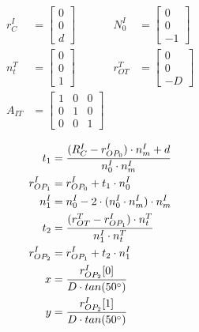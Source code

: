 \begin{align*}
    r^{I}_{C}       & =
    \begin{bmatrix}
        0 \\
        0 \\
        d
    \end{bmatrix} &
    N^{I}_{0}       & =
    \begin{bmatrix}
        0 \\
        0 \\
        -1
    \end{bmatrix}      \\
    n^{T}_{t}       & =
    \begin{bmatrix}
        0 \\
        0 \\
        1
    \end{bmatrix} &
    r^{T}_{OT}      & =
    \begin{bmatrix}
        0 \\
        0 \\
        -D
    \end{bmatrix}      \\
    A_{IT}          & =
    \begin{bmatrix}
        1 & 0 & 0 \\
        0 & 1 & 0 \\
        0 & 0 & 1
    \end{bmatrix}
\end{align*}




\begin{align*}
    t_{1}          & = \frac{ (R^{I}_{C} - r^{I}_{OP_{0}}) \cdot n^{I}_{m} + d }{n^{I}_{0} \cdot n^{I}_{m}} \\
    r^{I}_{OP_{1}} & = r^{I}_{OP_{0}} + t_{1} \cdot n^{I}_{0}                                               \\
    n^{I}_{1}      & = n^{I}_{0} - 2 \cdot ( n^{I}_{0} \cdot n^{I}_{m}) \cdot n^{I}_{m}                     \\
    t_{2}          & = \frac{ (r^{T}_{OT} - r^{I}_{OP_{1}}) \cdot n^{T}_{t}}{n^{I}_{1} \cdot n^{T}_{t}}     \\
    r^{I}_{OP_{2}} & = r^{I}_{OP_{1}} + t_{2} \cdot n^{I}_{1}                                               \\
    x              & = \frac{ r^{I}_{OP_{2}}[0] }{D \cdot tan(50 \degree)}                                  \\
    y              & = \frac{ r^{I}_{OP_{2}}[1] }{D \cdot tan(50 \degree)}
\end{align*}




